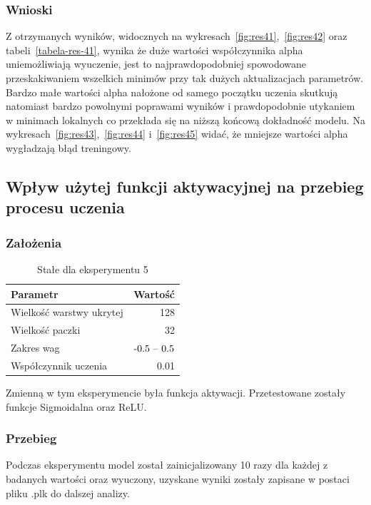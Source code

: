 \documentclass{article}
\begin{document}
\subsubsection*{Wnioski}

Z otrzymanych wyników, widocznych na wykresach~\ref{fig:res41},~\ref{fig:res42} oraz tabeli~\ref{tabela-res-41}, wynika że duże wartości współczynnika alpha uniemożliwiają wyuczenie, jest to najprawdopodobniej spowodowane przeskakiwaniem wszelkich minimów przy tak dużych aktualizacjach parametrów. Bardzo małe wartości alpha nałożone od samego początku uczenia skutkują natomiast bardzo powolnymi poprawami wyników i prawdopodobnie utykaniem w minimach lokalnych co przekłada się na niższą końcową dokładność modelu. Na wykresach~\ref{fig:res43},~\ref{fig:res44} i~\ref{fig:res45} widać, że mniejsze wartości alpha wygładzają błąd treningowy.

\newpage
\subsection{Wpływ użytej funkcji aktywacyjnej na przebieg procesu uczenia}
\subsubsection*{Założenia}
\begin{table}[H]
	\caption{Stałe dla eksperymentu 5}
	\label{tabela-const-5}
	\centering
	\begin{tabular}{lr}
		\toprule
		Parametr                   & Wartość         \\
		\midrule
		Wielkość warstwy ukrytej & 128               \\
		Wielkość paczki          & 32                \\
		Zakres wag                 & \($-0.5 -- 0.5$\) \\
		Współczynnik uczenia     & 0.01              \\
		\bottomrule
	\end{tabular}
\end{table}

Zmienną w tym eksperymencie była funkcja aktywacji. Przetestowane zostały funkcje Sigmoidalna oraz ReLU.
\subsubsection*{Przebieg}

Podczas eksperymentu model został zainicjalizowany 10 razy dla każdej z badanych wartości oraz wyuczony, uzyskane wyniki zostały zapisane w postaci pliku .plk do dalszej analizy.
\end{document}
